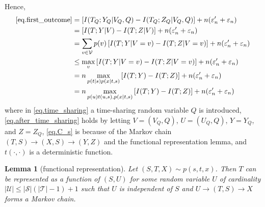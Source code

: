 \documentclass[12pt, Draft, onecolumn]{IEEEtran}
\def\calS{{\mathcal{S}}}
\def\calU{{\mathcal{U}}}
\def\calV{{\mathcal{V}}}
\def\calT{{\mathcal{T}}}
\newtheorem{lemma}{Lemma}
\begin{document}
Hence,
\begin{align}
\eqref{eq.first_outcome}
\label{eq.time_sharing}
&= \left[I(T_Q;Y_Q|V_Q,Q)-I(T_Q;Z_Q|V_Q,Q)\right]+n(\varepsilon_n'+\varepsilon_n)\\
\label{eq.after_time_sharing}
&= \left[I(T;Y|V)-I(T;Z|V)\right]+n(\varepsilon_n'+\varepsilon_n)\\
&= \sum_{v\in\calV}p(v)\left[I(T;Y|V=v)-I(T;Z|V=v)\right]+n(\varepsilon_n'+\varepsilon_n)\notag\\
&\leq \max_v \left[I(T;Y|V=v)-I(T;Z|V=v)\right]+n(\varepsilon_n'+\varepsilon_n)\notag\\
\label{eq.C_s}
&= n\max_{p(t|s)p(x|t,s)}\left[I(T;Y)-I(T;Z)\right]+n(\varepsilon_n'+\varepsilon_n)\notag\\
&= n\max_{p(u)t(u,s),p(x|t,s)}\left[I(T;Y)-I(T;Z)\right]+n(\varepsilon_n'+\varepsilon_n)
\end{align}
where in \eqref{eq.time_sharing} a time-sharing random variable $Q$ is introduced, \eqref{eq.after_time_sharing} holds by letting $V = (V_Q,Q)$, $U=(U_Q,Q)$, $Y=Y_Q$, and $Z=Z_Q$, \eqref{eq.C_s} is because of the Markov chain $(T,S)\rightarrow (X,S)\rightarrow (Y,Z)$ and the functional representation lemma, and $t(\cdot,\cdot)$ is a deterministic function.

\begin{lemma}[functional representation]
Let $(S,T,X)\sim p(s,t,x)$. Then $T$ can be represented as a function of $(S,U)$ for some random variable $U$ of cardinality $|\calU|\leq |\calS|(|\calT|-1)+1$ such that $U$ is independent of $S$ and $U\rightarrow (T,S)\rightarrow X$ forms a Markov chain.
\end{lemma}




%
%
\end{document}
